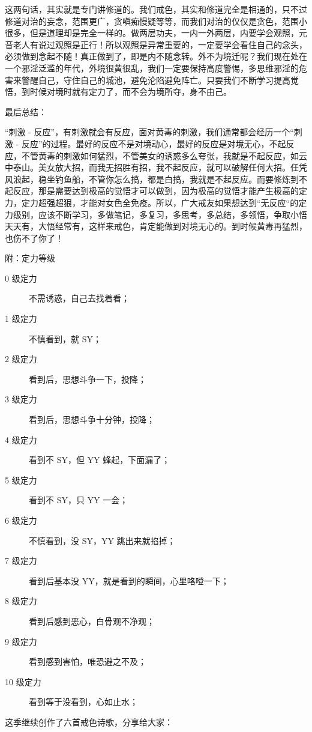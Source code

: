 这两句话，其实就是专门讲修道的。我们戒色，其实和修道完全是相通的，只不过修道对治的妄念，范围更广，贪嗔痴慢疑等等，而我们对治的仅仅是贪色，范围小很多，但是道理却是完全一样的。做两层功夫，一内一外两层，内要学会观照，元音老人有说过观照是正行！所以观照是异常重要的，一定要学会看住自己的念头，必须做到念起不随！真正做到了，即是内不随念转。外不为境迁呢？我们现在处在一个邪淫泛滥的年代，外境很黄很乱，我们一定要保持高度警惕，多思维邪淫的危害来警醒自己，守住自己的城池，避免沦陷避免阵亡。只要我们不断学习提高觉悟，到时候对境时就有定力了，而不会为境所夺，身不由己。

最后总结：

“刺激 - 反应”，有刺激就会有反应，面对黄毒的刺激，我们通常都会经历一个“刺激 - 反应”的过程。最好的反应不是对境动心，最好的反应是对境无心，不起反应，不管黄毒的刺激如何猛烈，不管美女的诱惑多么夸张，我就是不起反应，如云中泰山。美女放大招，而我无招胜有招，我不起反应，就可以破解任何大招。任凭风浪起，稳坐钓鱼船，不管你怎么搞，都是白搞，我就是不起反应。而要修炼到不起反应，那是需要达到极高的觉悟才可以做到，因为极高的觉悟才能产生极高的定力，定力超强超狠，才能对女色全免疫。所以，广大戒友如果想达到“无反应“的定力级别，应该不断学习，多做笔记，多复习，多思考，多总结，多领悟，争取小悟天天有，大悟经常有，这样来戒色，肯定能做到对境无心的。到时候黄毒再猛烈，也伤不了你了！


附：定力等级

\begin{description}
    \item[0 级定力] 不需诱惑，自己去找着看；
    \item[1 级定力] 不慎看到，就 SY；
    \item[2 级定力] 看到后，思想斗争一下，投降；
    \item[3 级定力] 看到后，思想斗争十分钟，投降；
    \item[4 级定力] 看到不 SY，但 YY 蜂起，下面漏了；
    \item[5 级定力] 看到不 SY，只 YY 一会；
    \item[6 级定力] 不慎看到，没 SY，YY 跳出来就掐掉；
    \item[7 级定力] 看到后基本没 YY，就是看到的瞬间，心里咯噔一下；
    \item[8 级定力] 看到后感到恶心，白骨观不净观；
    \item[9 级定力] 看到感到害怕，唯恐避之不及；
    \item[10 级定力] 看到等于没看到，心如止水；
\end{description}

这季继续创作了六首戒色诗歌，分享给大家：

